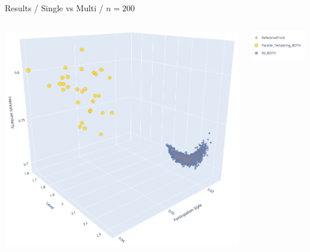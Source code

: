 \documentclass{beamer}
\begin{document}
    \begin{frame}{Results / Single vs Multi / $n=200$}
            \begin{columns}
                \begin{column}{0.70\textwidth}
                    \includegraphics[width=\textwidth]{images/200_both.png}
                \end{column}
                \begin{column}{0.30\textwidth}
                    \includegraphics[width=\textwidth]{images/legend_both.png}
                \end{column}
            \end{columns}\\
    \end{frame}
    
\end{document}

